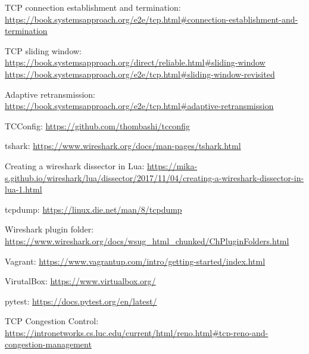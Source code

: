 
\begin{thebibliography}{1}
TCP connection establishment and termination: \\ \url{https://book.systemsapproach.org/e2e/tcp.html#connection-establishment-and-termination}

TCP sliding window: \\
\url{https://book.systemsapproach.org/direct/reliable.html#sliding-window} \\
\url{https://book.systemsapproach.org/e2e/tcp.html#sliding-window-revisited}

Adaptive retransmission: \\ \url{https://book.systemsapproach.org/e2e/tcp.html#adaptive-retransmission}

TCConfig: \url{https://github.com/thombashi/tcconfig}

tshark: \url{https://www.wireshark.org/docs/man-pages/tshark.html}

Creating a wireshark dissector in Lua: \url{https://mika-s.github.io/wireshark/lua/dissector/2017/11/04/creating-a-wireshark-dissector-in-lua-1.html}

tcpdump: \url{https://linux.die.net/man/8/tcpdump}

Wireshark plugin folder: \url{https://www.wireshark.org/docs/wsug_html_chunked/ChPluginFolders.html}

Vagrant: \url{https://www.vagrantup.com/intro/getting-started/index.html}

VirutalBox:  \url{https://www.virtualbox.org/}

pytest: \url{https://docs.pytest.org/en/latest/}

TCP Congestion Control: \url{https://intronetworks.cs.luc.edu/current/html/reno.html#tcp-reno-and-congestion-management}

\end{thebibliography}


